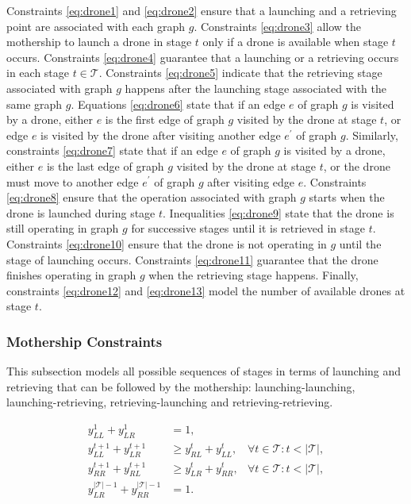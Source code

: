 \documentclass[10pt,a4paper]{elsarticle}
\newcommand{\EN}[1]{{\color{black}#1}}
\begin{document}
\noindent
Constraints \eqref{eq:drone1} and \eqref{eq:drone2} ensure that a launching and a retrieving point are associated \EN{with} each graph $g$. Constraints \eqref{eq:drone3} allow the mothership to launch a drone in stage $t$ only if a drone is available when stage $t$ occurs. Constraints \eqref{eq:drone4} guarantee that a launching or a retrieving occurs in each stage $t\in\mathcal T$. Constraints \eqref{eq:drone5} indicate that the retrieving stage associated \EN{with} graph $g$ happens after the launching stage associated \EN{with} the same graph $g$. Equations \eqref{eq:drone6} state that if an edge $e$ of graph $g$ is visited by a drone\EN{,} either $e$ is the first edge of graph $g$ visited by the drone at stage $t$, or edge $e$ is visited by the drone after visiting another edge $e^\prime$ of graph $g$. Similarly, constraints \eqref{eq:drone7} state that if an edge $e$ of graph $g$ is visited by a drone, either $e$ is the last edge of graph $g$ visited by the drone at stage $t$, or the drone must move to another edge $e^\prime$ of graph $g$ after visiting edge $e$.
Constraints \eqref{eq:drone8} ensure that the operation associated with graph $g$ starts when the drone is launched during stage $t$. Inequalities \eqref{eq:drone9} state that the drone is still operating in graph $g$ for successive stages until it is retrieved in stage $t$. Constraints \eqref{eq:drone10} ensure that the drone is not operating in $g$ until the stage of launching occurs. Constraints \eqref{eq:drone11} guarantee that the drone finishes operating in graph $g$ when the \EN{retrieving stage} happens. Finally, constraints \eqref{eq:drone12} and \eqref{eq:drone13} model the number of available drones at stage $t$.




\subsubsection*{Mothership Constraints}
\noindent
This subsection models all possible sequences of stages in terms of launching and retrieving that can be followed by the mothership: launching-launching, launching-retrieving, retrieving-launching and retrieving-retrieving. 


\begin{align}
y_{LL}^1 + y_{LR}^1 & = 1, \label{eq:mother1}\\
y_{LL}^{t+1} + y_{LR}^{t+1} & \geq y_{RL}^{t} + y_{LL}^{t}, &\forall t \in \mathcal T: t<|\mathcal T|,\label{eq:mother2}\\
y_{RR}^{t+1} + y_{RL}^{t+1} & \geq  y_{LR}^{t} + y_{RR}^{t}, &\forall t \in \mathcal T: t<|\mathcal T|,\label{eq:mother3}\\
y_{LR}^{|\mathcal T|-1} + y_{RR}^{|\mathcal T|-1} & = 1. \label{eq:mother4}
\end{align}
\end{document}
